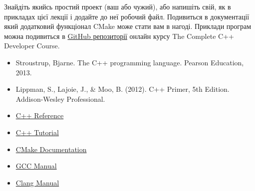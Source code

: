 \documentclass[12pt]{article}
\begin{document}
	Знайдіть якийсь простий проект (ваш або чужий), або напишіть свій, як в прикладах цієї лекції і додайте до неї робочий  файл. Подивиться в документації який додатковий функціонал CMake може стати вам в нагоді. Приклади програм можна подивиться в \href{https://github.com/profjpbaugh/complete-cpp-developer-course}{GitHub репозиторії} онлайн курсу The Complete C++ Developer Course.
	
	
	\begin{itemize}
		\item Stroustrup, Bjarne. The C++ programming language. Pearson Education, 2013.
		\item Lippman, S., Lajoie, J., \& Moo, B. (2012). C++ Primer, 5th Edition. Addison-Wesley Professional.
		\item \href{https://en.cppreference.com/w/cpp}{C++ Reference}
		\item \href{http://www.cplusplus.com/doc/tutorial/}{C++ Tutorial}
		\item \href{https://cmake.org/cmake/help/latest/}{CMake Documentation}
		\item \href{https://gcc.gnu.org/onlinedocs/gcc-12.2.0/gcc/}{GCC Manual}
		\item \href{https://releases.llvm.org/10.0.0/tools/clang/docs/index.html}{Clang Manual}
	\end{itemize}
	
	
\end{document}
